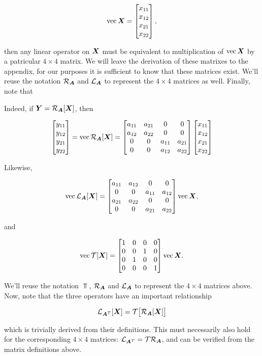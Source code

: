 \documentclass[useAMS,usenatbib]{mn2e}
\newcommand{\mat}[1]{{\bmath{#1}}}
\begin{document}
\newcommand{\VEC}[1]{\mathrm{vec}\,{#1}}

\[
\VEC{\mat{X}} = \Matrix{c}{x_{11}\\x_{12}\\x_{21}\\x_{22}},
\]

then any linear operator on $\mat{X}$ must be equivalent to multiplication of $\VEC{\mat{X}}$ by a patricular $4\times 4$ matrix. We will leave the derivation of these matrixes to the appendix, for our purposes it is sufficient to know that these matrices exist. We'll reuse the notation 
$\Rop{\mat{A}}$ and $\Lop{\mat{A}}$ to represent the $4\times4$ matrices as well. Finally, note that

Indeed, if $\mat{Y}=\Rop{\mat{A}}[\mat{X}]$, then 

\begin{equation}
\Matrix{c}{y_{11}\\y_{12}\\y_{21}\\y_{22}} = \VEC{\Rop{\mat{A}}[\mat{X}]} = 
\Matrix{cccc}{a_{11}&a_{21}&0&0 \\ a_{12}&a_{22}&0&0 \\ 0&0&a_{11}&a_{21} \\ 0&0&a_{12}&a_{22} }
\Matrix{c}{x_{11}\\x_{12}\\x_{21}\\x_{22}} 
\end{equation}

Likewise, 

\begin{equation}
\VEC{\Lop{\mat{A}}[\mat{X}]} = 
\Matrix{cccc}{a_{11}&a_{12}&0&0 \\ 0&0&a_{11}&a_{12} \\ a_{21}&a_{22}&0&0  \\ 0&0&a_{21}&a_{22} }
\VEC{\mat{X}},
\end{equation}

and

\begin{equation}
\VEC{\Top[\mat{X}]} = 
\Matrix{cccc}{1&0&0&0 \\ 0&0&1&0 \\ 0&1&0&0 \\ 0&0&0&1} \VEC{\mat{X}}.
\end{equation}


We'll reuse the notation $\Top$, $\Rop{\mat{A}}$ and $\Lop{\mat{A}}$ to represent the $4\times4$ matrices above. Now, note that the
three operators have an important relationship

\begin{equation}
\Lop{\mat{A}^T}[\mat{X}] = \Top \big[ \Rop{\mat{A}}[\mat{X}] \big ]
\end{equation}

which is trivially derived from their definitions. This must necessarily also hold for the corresponding $4\times4$ matrices:
$\Lop{\mat{A}^T} = \Top \Rop{\mat{A}}$, and can be verified from the matrix definitions above.


\label{lastpage}
\end{document}

